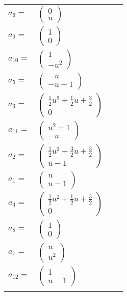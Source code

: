 \documentclass[1p]{elsarticle_modified}
\theoremstyle{definition}
\begin{document}
\begin{tabular}{m{7pt} m{180pt} m{7pt} m{180pt} }
\flushright $a_{6}=$&$\begin{pmatrix}0\\u\end{pmatrix}$ \\
\flushright $a_{9}=$&$\begin{pmatrix}1\\0\end{pmatrix}$ \\
\flushright $a_{10}=$&$\begin{pmatrix}1\\- u^2\end{pmatrix}$ \\
\flushright $a_{5}=$&$\begin{pmatrix}- u\\- u+1\end{pmatrix}$ \\
\flushright $a_{3}=$&$\begin{pmatrix}\frac{1}{2} u^2+\frac{1}{2} u+\frac{3}{2}\\0\end{pmatrix}$ \\
\flushright $a_{11}=$&$\begin{pmatrix}u^2+1\\- u\end{pmatrix}$ \\
\flushright $a_{2}=$&$\begin{pmatrix}\frac{1}{2} u^2+\frac{3}{2} u+\frac{3}{2}\\u-1\end{pmatrix}$ \\
\flushright $a_{1}=$&$\begin{pmatrix}u\\u-1\end{pmatrix}$ \\
\flushright $a_{4}=$&$\begin{pmatrix}\frac{1}{2} u^2+\frac{1}{2} u+\frac{3}{2}\\0\end{pmatrix}$ \\
\flushright $a_{8}=$&$\begin{pmatrix}1\\0\end{pmatrix}$ \\
\flushright $a_{7}=$&$\begin{pmatrix}u\\u^2\end{pmatrix}$ \\
\flushright $a_{12}=$&$\begin{pmatrix}1\\u-1\end{pmatrix}$\\&\end{tabular}
\end{document}
